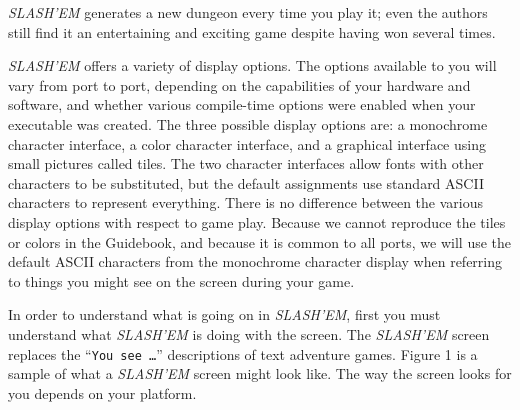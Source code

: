 {\it SLASH'EM\/} generates a new dungeon every time you play it; even the
authors still find it an entertaining and exciting game despite
having won several times.

{\it SLASH'EM\/} offers a variety of display options.  The options available to you
will vary from port to port, depending on the capabilities of your
hardware and software, and whether various compile-time options were
enabled when your executable was created.  The three possible display
options are: a monochrome character interface, a color character interface,
and a graphical interface using small pictures called tiles.  The two
character interfaces allow fonts with other characters to be substituted,
but the default assignments use standard ASCII characters to represent
everything.  There is no difference between the various display options
with respect to game play.  Because we cannot reproduce the tiles or
colors in the Guidebook, and because it is common to all ports, we will
use the default ASCII characters from the monochrome character display
when referring to things you might see on the screen during your game.

In order to understand what is going on in {\it SLASH'EM}, first you must
understand what {\it SLASH'EM\/} is doing with the screen.  The {\it SLASH'EM\/} screen
replaces the ``{\tt You see  \ldots}'' descriptions of text adventure games.
Figure 1 is a sample of what a {\it SLASH'EM\/} screen might look like.
The way the screen looks for you depends on your platform.

